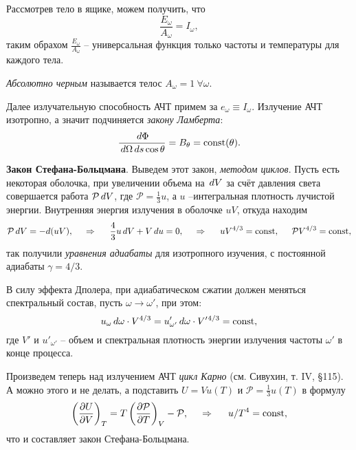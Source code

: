 Рассмотрев тело в ящике, можем получить, что
\begin{equation*}
    \frac{E_\omega}{A_\omega} =  I_\omega,
\end{equation*}
таким обрахом $\frac{E_\omega}{A_\omega}$ -- универсальная функция только частоты и температуры для каждого тела. 



\begin{to_def}
    \textit{Абсолютно черным} называется телос $A_\omega = 1 \ \forall \omega$.
\end{to_def}

Далее излучательную способность АЧТ примем за $e_\omega \equiv I_\omega$. Излучение АЧТ изотропно, а значит подчиняется \textit{закону Ламберта}:
\begin{equation*}
    \frac{\, d \Phi}{\, d \Omega \, d s \cos \theta} = B_\theta = \textnormal{const}(\theta).
\end{equation*}


\textbf{Закон Стефана-Больцмана}. Выведем этот закон, \textit{методом циклов}. Пусть есть некоторая оболочка, при увеличении объема на $\, d V$ за счёт давления света совершается работа $\mathcal P \, d V$, где $\mathcal P = \frac{1}{3} u$,  а $u$ --интегральная плотность лучистой энергии. Внутренняя энергия излучения в оболочке  $uV$, откуда находим
\begin{equation*}
    \mathcal P \, d V = - d(uV),
    \hspace{0.5cm} \Rightarrow \hspace{0.5cm}
    \frac{4}{3} u \, d V + V \, d u = 0,
    \hspace{0.5cm} \Rightarrow \hspace{0.5cm}
    u V^{4/3} = \textnormal{const}, \hspace{5 mm} \mathcal P V^{4/3} = \textnormal{const},
\end{equation*}
так получили \textit{уравнения адиабаты} для изотропного изучения, с постоянной адиабаты $\gamma = 4/3$. 



В силу эффекта Дполера, при адиабатическом сжатии должен меняться спектральный состав, пусть $\omega \to \omega'$, при этом:
\begin{equation*}
    u_\omega \, d \omega \cdot V^{4/3} = u'_{\omega'} \, d \omega \cdot V'{}^{4/3} = \textnormal{const},
\end{equation*}
где $V'$ и $u'_{\omega'}$ -- объем и спектральная плотность энергии излучения частоты $\omega'$ в конце процесса. 


Произведем теперь над излучением АЧТ \textit{цикл Карно} (см. Сивухин, т. IV, \S 115).  А можно этого и не делать, а подставить $U = V u(T)$ и $\mathcal P = \frac{1}{3} u(T)$ в формулу
\begin{equation*}
    \left(\frac{\partial U}{\partial V} \right)_T = T \left(\frac{\partial \mathcal P}{\partial T} \right)_V - \mathcal P,
    \hspace{0.5cm} \Rightarrow \hspace{0.5cm}
    u/T^4 = \textnormal{const},
\end{equation*}
что и составляет закон Стефана-Больцмана. 


